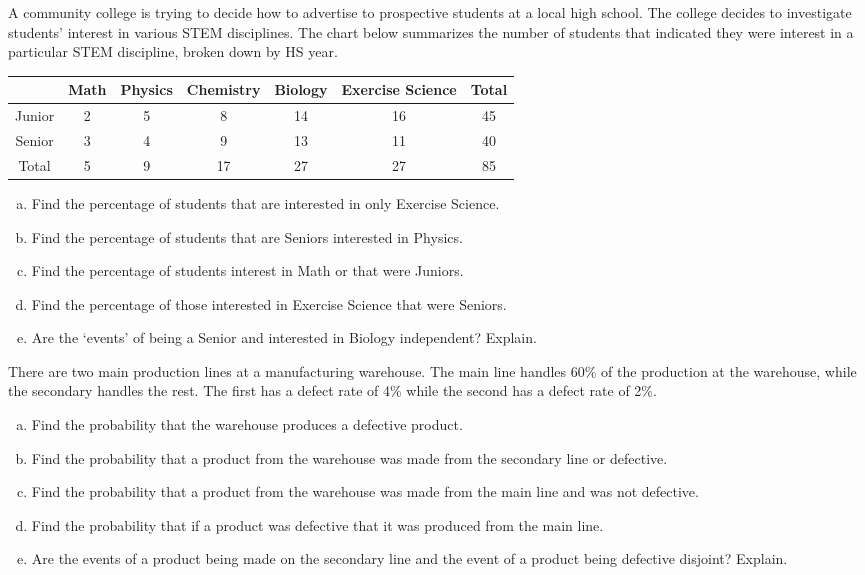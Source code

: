 \documentclass[11pt,letterpaper]{article}
\begin{document}

 A community college is trying to decide how to advertise to prospective students at a local high school. The college decides to investigate students' interest in various STEM disciplines. The chart below summarizes the number of students that indicated they were interest in a particular STEM discipline, broken down by HS year. \par
	\begin{table}[H]
	\centering
	\begin{tabular}{|c||ccccc||c|} \hline
	& Math & Physics & Chemistry & Biology & Exercise Science & Total \\ \hline
	Junior & 2 & 5 & 8 & 14 & 16 & 45 \\ 
	Senior & 3 & 4 & 9 & 13 & 11 & 40 \\ \hline
	Total & 5 & 9 & 17 & 27 & 27 & 85 \\ \hline
	\end{tabular}
	\end{table} 

\begin{enumerate}[(a)]
\item Find the percentage of students that are interested in only Exercise Science. 
\item Find the percentage of students that are Seniors interested in Physics. 
\item Find the percentage of students interest in Math or that were Juniors. 
\item Find the percentage of those interested in Exercise Science that were Seniors. 
\item Are the `events' of being a Senior and interested in Biology independent? Explain. 
\end{enumerate}



\newpage



 There are two main production lines at a manufacturing warehouse. The main line handles 60\% of the production at the warehouse, while the secondary handles the rest. The first has a defect rate of 4\% while the second has a defect rate of 2\%. 
	\begin{enumerate}[(a)]
	\item Find the probability that the warehouse produces a defective product. 
	\item Find the probability that a product from the warehouse was made from the secondary line or defective. 
	\item Find the probability that a product from the warehouse was made from the main line and was not defective. 
	\item Find the probability that if a product was defective that it was produced from the main line. 
	\item Are the events of a product being made on the secondary line and the event of a product being defective disjoint? Explain. 
	\end{enumerate}
\end{document}

